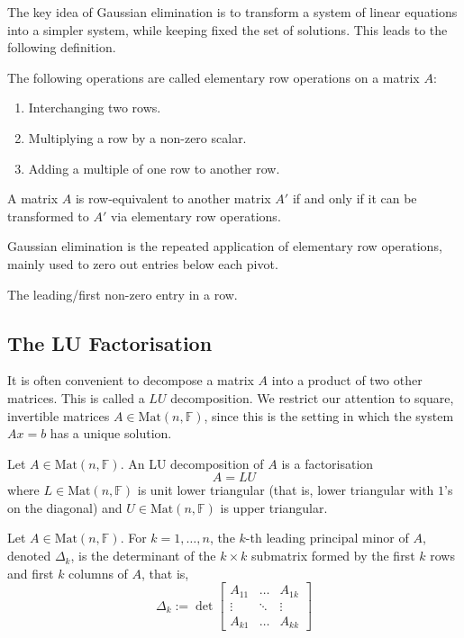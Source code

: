 		\noindent The key idea of Gaussian elimination is to transform a system of linear equations into a simpler system, while keeping fixed the set of solutions. This leads to the following definition.
		
		\begin{definition}
			The following operations are called elementary row operations on a matrix $A$:
			\begin{enumerate}[label=\roman*.]
				\item Interchanging two rows.
				\item Multiplying a row by a non-zero scalar.
				\item Adding a multiple of one row to another row.
			\end{enumerate}
			A matrix $A$ is row-equivalent to another matrix $A'$ if and only if it can be transformed to $A'$ via elementary row operations. 
		\end{definition}
		
		\noindent Gaussian elimination is the repeated application of elementary row operations, mainly used to zero out entries below each pivot.
		
		\begin{definition}[Pivot]
			The leading/first non-zero entry in a row.
		\end{definition}
		
	\subsection{The LU Factorisation}
		
		\noindent It is often convenient to decompose a matrix $A$ into a product of two other matrices. This is called a $LU$ decomposition. We restrict our attention to square, invertible matrices $A \in \text{Mat}(n, \mathbb{F})$, since this is the setting in which the system $Ax = b$ has a unique solution.
		
		\begin{definition}[LU Decomposition]
			\label{def:lu-decomposition}
			Let $A \in \text{Mat}(n, \mathbb{F})$. An LU decomposition of $A$ is a factorisation
			\[
				A = LU
			\]
			where $L \in \text{Mat}(n, \mathbb{F})$ is unit lower triangular (that is, lower triangular with $1$'s on the diagonal) and $U \in \text{Mat}(n, \mathbb{F})$ is upper triangular.
		\end{definition}
		
		\begin{definition}
			Let $A \in \text{Mat}(n, \mathbb{F})$. For $k = 1, \dots, n$, the $k$-th leading principal minor of $A$, denoted $\Delta_k$, is the determinant of the $k \times k$ submatrix formed by the first $k$ rows and first $k$ columns of $A$, that is,
			\[
				\Delta_k := \det \begin{bmatrix} 
					A_{11} & \dots & A_{1k} \\ 
					\vdots & \ddots & \vdots \\ 
					A_{k1} & \dots & A_{kk} 
					\end{bmatrix}
			\]
		\end{definition}
		
